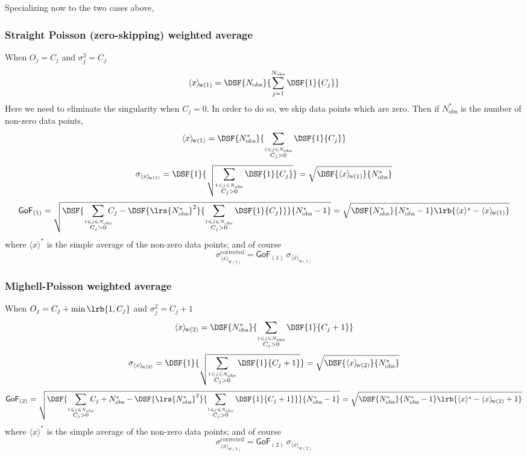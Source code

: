 Specializing now to the two cases above, 

\subsubsection{Straight Poisson (zero-skipping) weighted average}

When $O_j=C_j$ and $\sigma_j^2=C_j$
\[
\langle x \rangle_{\!\mathrm{w(1)}}=\DSF{
{N_{\mathrm{obs}}}
}{
\mathop{\sum}_{j=1}^{N_{\mathrm{obs}}}
\DSF{1
}{
C_j
}
}
\]
Here we need to eliminate the singularity when $C_j=0$. In order to do so, we skip data points which are zero. 
Then if $N_{\mathrm{obs}}^*$ is the number of non-zero data points, 
\[
\langle x \rangle_{\!\mathrm{w(1)}}=\DSF{
{N_{\mathrm{obs}}^*}
}{
\mathop{\sum}_{\stackrel{1\leqslant j\leqslant N_{\mathrm{obs}}}{{C_j>0}}}
\DSF{1
}{
C_j
}
}
\]
\[
\sigma_{\langle x \rangle_{\!\mathrm{w(1)}}} = \DSF{
1
}{\sqrt{
\mathop{\sum}_{\stackrel{1\leqslant j\leqslant N_{\mathrm{obs}}}{{C_j>0}}}
\DSF{1
}{
C_j
}
}}=\sqrt{\DSF{\langle x \rangle_{\!\mathrm{w(1)}}}{
N_{\mathrm{obs}}^*
}}
\]
\[
\mathsf{GoF}_{(1)}=
\sqrt{
\DSF{
\mathop{\sum}_{\stackrel{1\leqslant j\leqslant N_{\mathrm{obs}}}{{C_j>0}}}
\!\!\!\!C_j
%
-\DSF{
\lrs{
N_{\mathrm{obs}}^*
}^2
}{ \mathop{\sum}_{\stackrel{1\leqslant j\leqslant N_{\mathrm{obs}}}{{C_j>0}}}
\DSF{1
}{
C_j
} }
}{
N_{\mathrm{obs}}^*-1
}
}
=\sqrt{
\DSF{N_{\mathrm{obs}}^*}{N_{\mathrm{obs}}^*-1}
\lrb{
\langle x\rangle^*-\langle x \rangle_{\!\mathrm{w(1)}}
}
}
\]
where $\langle x\rangle^*$ is the simple average of the non-zero data points; and of course
\[
{\sigma}_{\langle x \rangle_{\!\mathrm{w(1)}}}^{\mathrm{corrected}} = \mathsf{GoF}_{(1)}\ \sigma_{\langle x \rangle_{\!\mathrm{w(1)}}}
\] 

\subsubsection{Mighell-Poisson weighted average}

When $O_j=C_j+\min\lrb{1,C_j}$ and $\sigma_j^2=C_j+1$
\[
\langle x \rangle_{\!\mathrm{w(2)}}=\DSF{
{N_{\mathrm{obs}}^*}
}{
\mathop{\sum}_{\stackrel{1\leqslant j\leqslant N_{\mathrm{obs}}}{{C_j>0}}}
\DSF{1
}{
C_j+1
}
}
\]
\[
\sigma_{\langle x \rangle_{\!\mathrm{w(2)}}} = \DSF{
1
}{\sqrt{
\mathop{\sum}_{\stackrel{1\leqslant j\leqslant N_{\mathrm{obs}}}{{C_j>0}}}
\DSF{1
}{
C_j+1
}
}}=\sqrt{\DSF{\langle x \rangle_{\!\mathrm{w(2)}}}{
N_{\mathrm{obs}}^*
}}
\]
\[
\mathsf{GoF}_{(2)}=
\sqrt{
\DSF{
\mathop{\sum}_{\stackrel{1\leqslant j\leqslant N_{\mathrm{obs}}}{{C_j>0}}}
\!\!\!\!C_j+N_{\mathrm{obs}}^*
%
-\DSF{
\lrs{
N_{\mathrm{obs}}^*
}^2
}{ \mathop{\sum}_{\stackrel{1\leqslant j\leqslant N_{\mathrm{obs}}}{{C_j>0}}}
\DSF{1
}{
C_j+1
} }
}{
N_{\mathrm{obs}}^*-1
}
}
=\sqrt{
\DSF{N_{\mathrm{obs}}^*}{N_{\mathrm{obs}}^*-1}
\lrb{
\langle x\rangle^*-\langle x \rangle_{\!\mathrm{w(2)}}+1
}
}
\]
where $\langle x\rangle^*$ is the simple average of the non-zero data points; and of course
\[
{\sigma}_{\langle x \rangle_{\!\mathrm{w(2)}}}^{\mathrm{corrected}} = \mathsf{GoF}_{(2)}\ \sigma_{\langle x \rangle_{\!\mathrm{w(2)}}}
\] 






